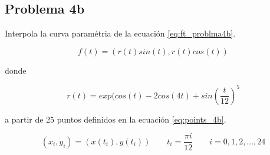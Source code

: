 \subsection*{Problema 4b}

Interpola la curva paramétria de la ecuación \ref{eq:ft_problma4b}.

\begin{equation}
	f(t) = (r(t)sin(t),r(t)cos(t)) \label{eq:ft_problma4b}
\end{equation}

donde

\begin{equation*}
	r(t) = exp(cos(t)-2cos(4t)+sin\left (\frac{t}{12}\right )^5
\end{equation*}

a partir de 25 puntos definidos en la ecuación \ref{eq:points_4b}.

\begin{equation}
	(x_i,y_i) = (x(t_i),y(t_i)) \qquad t_i = \frac{\pi i}{12} \qquad i=0,1,2,\dots,24 \label{eq:points_4b}
\end{equation}

